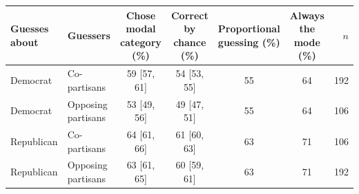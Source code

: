 \begin{tabular}{llccccr}
\toprule
Guesses about & Guessers & Chose modal category (\%) & Correct by chance (\%) & Proportional guessing (\%) & Always the mode (\%) & $n$ \\
\midrule
Democrat & Co-partisans & 59 [57, 61] & 54 [53, 55] & 55 & 64 & 192 \\
Democrat & Opposing partisans & 53 [49, 56] & 49 [47, 51] & 55 & 64 & 106 \\
Republican & Co-partisans & 64 [61, 66] & 61 [60, 63] & 63 & 71 & 106 \\
Republican & Opposing partisans & 63 [61, 65] & 60 [59, 61] & 63 & 71 & 192 \\
\bottomrule
\end{tabular}
